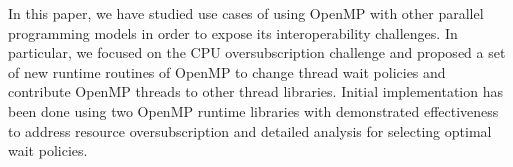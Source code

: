 In this paper, we have studied use cases of using OpenMP with other parallel programming models
in order to expose its interoperability challenges.  
In particular, we focused on the CPU oversubscription challenge and proposed a set of new runtime routines of OpenMP
to change thread wait policies 
and contribute OpenMP threads to other thread libraries. 
Initial implementation has been done using two OpenMP runtime libraries with demonstrated effectiveness
to address resource oversubscription and detailed analysis for selecting optimal wait policies.

\begin{comment}
One feature is 
that allowing the user to create a new OpenMP thread and assign a task to it instead 
of creating new user thread. We have implement a function to allow users to get one 
thread from the existing thread pool is any threads are available, and assign one task 
to this thread, this helps to take advantage of the OpenMP thread pool and won’t need 
to create a new thread to work on it, which helps to save the memory usage and speed up the runtime.

We have studied the waiting policy of the OpenMP and how the current OpenMP Runtime System deals with the thread pool. Considering there are two waiting policies, one called throughput (passive), which is designed to make the program aware of its environment (that is, the system load) and to adjust its resource usage to produce efficient execution in a dynamic environment. While the other one called turnaround (active), which is designed to keep active all of the processors involved in the parallel computation in order to minimize the execution time of a single job. We cannot simply say which one is better than the other, it depends one the executing environment. When setting the wait policy to be passive, after a certain period of time has elapsed, the useless thread will stop waiting and sleep. Thus active mode may be better for high-density of OpenMP tasks. While, a passive mode with a small blocktime value may offer better overall performance if your application contains non-OpenMP threaded code that executes between parallel regions. 

In addition, we have implemented a new function to shutdown the whole runtime library when exiting the parallel region. Since all threads are maintained in the same thread pool, quiesce will reap every threads to free the memory, which sometimes help to clear the runtime environment when the task density is lower and we don’t need to wake up most of the thread in the thread pool. However, when entering new parallel regions, we need to make sure that we register the current working thread as our root thread, so that new runtime environment can be built on it. It cost time to restart another parallel region, thus works slower when lots of tasks in the task queue.
\end{comment}

